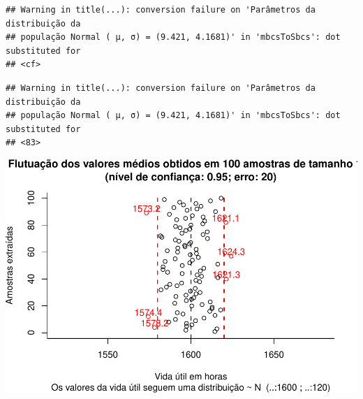 \documentclass[
]{book}
\begin{document}
\begin{verbatim}
## Warning in title(...): conversion failure on 'Parâmetros da distribuição da
## população Normal ( μ, σ) = (9.421, 4.1681)' in 'mbcsToSbcs': dot substituted for
## <cf>
\end{verbatim}

\begin{verbatim}
## Warning in title(...): conversion failure on 'Parâmetros da distribuição da
## população Normal ( μ, σ) = (9.421, 4.1681)' in 'mbcsToSbcs': dot substituted for
## <83>
\end{verbatim}

\includegraphics{apostila_files/figure-latex/unnamed-chunk-105-1.pdf}
\end{document}
